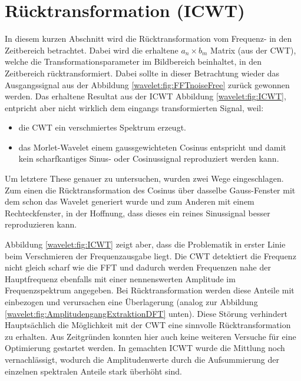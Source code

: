 %
%
%
%
\section{Rücktransformation (ICWT)
	\label{wavelets:section:teil5}}

In diesem kurzen Abschnitt wird die Rücktransformation vom Frequenz-
in den Zeitbereich betrachtet.
Dabei wird die erhaltene $a_n \times b_m$ Matrix (aus der CWT),
welche die Transformationsparameter im Bildbereich beinhaltet, in
den Zeitbereich rücktransformiert.
Dabei sollte in dieser Betrachtung wieder das Ausgangssignal aus
der Abbildung \ref{wavelet:fig:FFTnoiseFree} zurück gewonnen werden.
Das erhaltene Resultat aus der ICWT Abbildung \ref{wavelet:fig:ICWT},
entpricht aber nicht wirklich dem eingangs transformierten Signal,
weil:

\begin{itemize}
	\item die CWT ein verschmiertes Spektrum erzeugt.
	\item das Morlet-Wavelet einem gaussgewichteten Cosinus
	entspricht und damit kein scharfkantiges Sinus- oder
	Cosinussignal reproduziert werden kann.
\end{itemize}

Um letztere These genauer zu untersuchen, wurden zwei Wege eingeschlagen.
Zum einen die Rücktransformation des Cosinus über dasselbe Gauss-Fenster
mit dem schon das Wavelet generiert wurde und zum Anderen mit einem
Rechteckfenster, in der Hoffnung, dass dieses ein reines Sinussignal
besser reproduzieren kann.

Abbildung \ref{wavelet:fig:ICWT} zeigt aber, dass die Problematik
in erster Linie beim Verschmieren der Frequenzausgabe liegt.
Die CWT detektiert die Frequenz nicht gleich scharf wie die FFT und
dadurch werden Frequenzen nahe der Hauptfrequenz ebenfalls mit einer
nennenswerten Amplitude im Frequenzspektrum angegeben.
Bei Rücktransformation werden diese Anteile mit einbezogen und
verursachen eine Überlagerung (analog zur Abbildung
\ref{wavelet:fig:AmplitudengangExtraktionDFT} unten).
Diese Störung verhindert Hauptsächlich die Möglichkeit mit der CWT eine sinnvolle Rücktransformation zu erhalten.
Aus Zeitgründen konnten hier auch keine weiteren Versuche für eine
Optimierung gestartet werden.
In gemachten ICWT wurde die Mittlung noch vernachlässigt, wodurch
die Amplitudenwerte durch die Aufsummierung der einzelnen spektralen
Anteile stark überhöht sind.

